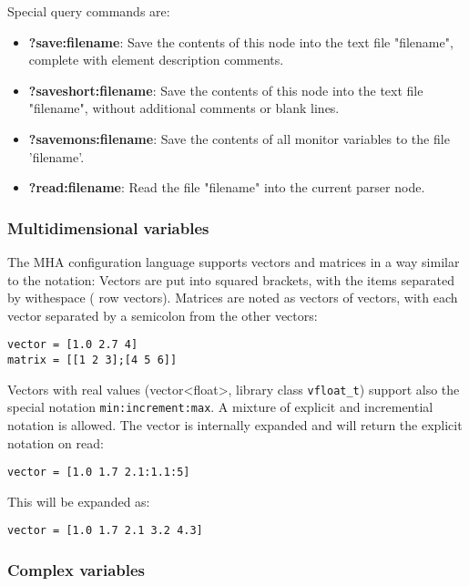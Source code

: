 Special query commands are:
%
%
%
%

\begin{itemize}
\item {\bf ?save:filename}: Save the contents of this node into the
text file "filename", complete with element description comments.
\item {\bf ?saveshort:filename}: Save the contents of this node into the
text file "filename", without additional comments or blank lines.
\item {\bf ?savemons:filename}: Save the contents of all monitor variables to
  the file 'filename'.
\item {\bf ?read:filename}: Read the file "filename" into the current
parser node.
\end{itemize}

\subsubsection{Multidimensional variables}%
%
%

The MHA configuration language supports vectors and matrices in a way similar
to the \Matlab{} notation: Vectors are put into squared brackets, with
the items separated by withespace (\Matlab{} row vectors). Matrices are
noted as vectors of vectors, with each vector separated by a semicolon
from the other vectors:

\begin{verbatim}
vector = [1.0 2.7 4]
matrix = [[1 2 3];[4 5 6]]
\end{verbatim}

Vectors with real values (vector<float>, library class
\verb!vfloat_t!) support also the special notation
\verb!min:increment:max!. A mixture of explicit and incremential
notation is allowed. The vector is internally expanded and will return
the explicit notation on read:

\begin{verbatim}
vector = [1.0 1.7 2.1:1.1:5]
\end{verbatim}

This will be expanded as:

\begin{verbatim}
vector = [1.0 1.7 2.1 3.2 4.3]
\end{verbatim}

\subsubsection{Complex variables}%
%
%

